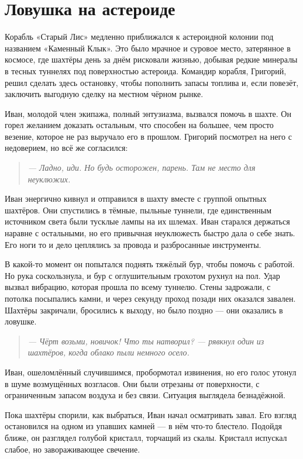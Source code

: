 \documentclass[12pt,a4paper]{book}
\newenvironment{dialogue}{\begin{quote}\itshape}{\end{quote}} %
\begin{document}
\chapter{Ловушка на астероиде}

Корабль «Старый Лис» медленно приближался к астероидной колонии под названием «Каменный Клык». Это было мрачное и суровое место, затерянное в космосе, где шахтёры день за днём рисковали жизнью, добывая редкие минералы в тесных туннелях под поверхностью астероида. Командир корабля, Григорий, решил сделать здесь остановку, чтобы пополнить запасы топлива и, если повезёт, заключить выгодную сделку на местном чёрном рынке.

Иван, молодой член экипажа, полный энтузиазма, вызвался помочь в шахте. Он горел желанием доказать остальным, что способен на большее, чем просто везение, которое не раз выручало его в прошлом. Григорий посмотрел на него с недоверием, но всё же согласился:

\begin{dialogue}
--- Ладно, иди. Но будь осторожен, парень. Там не место для неуклюжих.
\end{dialogue}

Иван энергично кивнул и отправился в шахту вместе с группой опытных шахтёров. Они спустились в тёмные, пыльные туннели, где единственным источником света были тусклые лампы на их шлемах. Иван старался держаться наравне с остальными, но его привычная неуклюжесть быстро дала о себе знать. Его ноги то и дело цеплялись за провода и разбросанные инструменты.

В какой-то момент он попытался поднять тяжёлый бур, чтобы помочь с работой. Но рука соскользнула, и бур с оглушительным грохотом рухнул на пол. Удар вызвал вибрацию, которая прошла по всему туннелю. Стены задрожали, с потолка посыпались камни, и через секунду проход позади них оказался завален. Шахтёры закричали, бросились к выходу, но было поздно --- они оказались в ловушке.

\begin{dialogue}
--- Чёрт возьми, новичок! Что ты натворил? --- рявкнул один из шахтёров, когда облако пыли немного осело.
\end{dialogue}

Иван, ошеломлённый случившимся, пробормотал извинения, но его голос утонул в шуме возмущённых возгласов. Они были отрезаны от поверхности, с ограниченным запасом воздуха и без связи. Ситуация выглядела безнадёжной.

Пока шахтёры спорили, как выбраться, Иван начал осматривать завал. Его взгляд остановился на одном из упавших камней --- в нём что-то блестело. Подойдя ближе, он разглядел голубой кристалл, торчащий из скалы. Кристалл испускал слабое, но завораживающее свечение.
\end{document}
